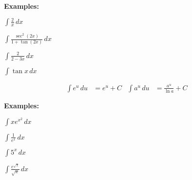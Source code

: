 \documentclass[addpoints, 12pt]{exam}
\begin{document}
\noindent\textbf{Examples:}
\begin{questions}
    \begin{minipage}{0.45\linewidth}
        \question $\displaystyle\int\frac{2}{x}\,dx$
    \end{minipage}
    \hfill
    \begin{minipage}{0.45\linewidth}
        \question $\displaystyle\int\frac{\sec^2(2x)}{1+\tan(2x)}\,dx$
    \end{minipage}
    
    
    \begin{minipage}{0.45\linewidth}
        \question $\displaystyle\int\frac{2}{2-3x}\,dx$
    \end{minipage}
    \hfill
    \begin{minipage}{0.45\linewidth}
        \question $\displaystyle\int\tan x\,dx$
    \end{minipage}
    
    
\end{questions}

\begin{tcolorbox}[title= INTEGRAL OF EXPONENTIAL FUNCTIONS,black,sharp corners,colback=white,colbacktitle=white,coltitle=black,boxrule=1pt]

    \begin{align*}
        \displaystyle\int e^u\,du &= e^u +C & \displaystyle\int a^u\,du &= \displaystyle\frac{a^u}{\ln a}+C
    \end{align*}
    
\end{tcolorbox}

\noindent\textbf{Examples:}
\begin{questions}
    \begin{minipage}{0.45\linewidth}
        \question $\displaystyle\int x e^{x^2}\,dx$
    \end{minipage}
    \hfill
    \begin{minipage}{0.45\linewidth}
        \question $\displaystyle\int\frac{1}{e^x}\,dx$
    \end{minipage}
    
    
    \begin{minipage}{0.45\linewidth}
        \question $\displaystyle\int5^x\,dx$
    \end{minipage}
    \hfill
    \begin{minipage}{0.45\linewidth}
        \question $\displaystyle\int\frac{e^{\sqrt{x}}}{\sqrt{x}}\,dx$
    \end{minipage}
    
    
\end{questions}
\end{document}
